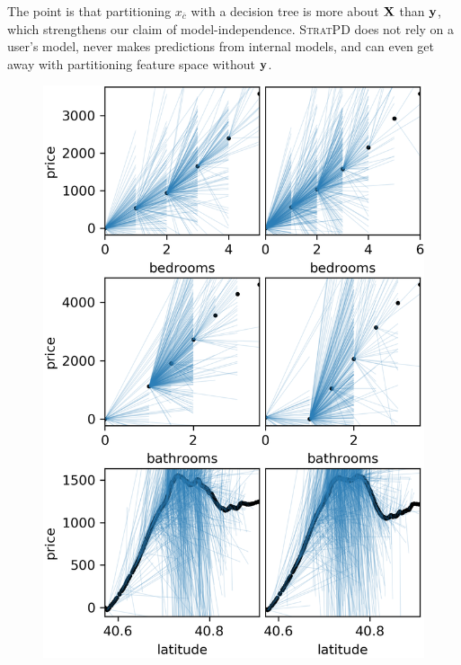 \documentclass[12pt]{article}
\newcommand{\spd}{\fontfamily{cmr}\textsc{\small StratPD}}
\newcommand{\xnc}{$x_{\overline{c}}$}
\begin{document}
The point is that partitioning \xnc{}  with a decision tree is more about $\bf X$ than $\bf y$, which strengthens our claim of model-independence. \spd{} does not rely on a user's model, never makes predictions from internal models, and can even get away with partitioning feature space without $\bf y$.

\begin{figure}[htbp]
\begin{center}
\includegraphics[scale=0.7]{images/rent_unsup.png}

\end{center}
\end{figure}
\end{document}
